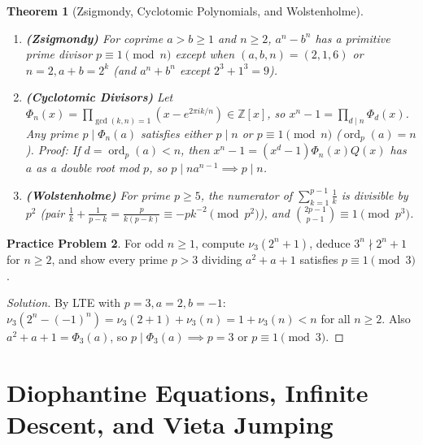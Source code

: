 \documentclass[11pt]{article}
\theoremstyle{plain}
\newtheorem{theorem}{Theorem}[section]
\theoremstyle{definition}
\newtheorem{problem}[theorem]{Practice Problem}
\newenvironment{solution}{\begin{proof}[Solution]}{\end{proof}}
\newcommand{\ZZ}{\mathbb{Z}}
\newcommand{\ord}{\operatorname{ord}}
\begin{document}
\begin{theorem}[Zsigmondy, Cyclotomic Polynomials, and Wolstenholme]
\leavevmode
\begin{enumerate}[label=(\alph*)]
\item \textbf{(Zsigmondy)} For coprime $a > b \ge 1$ and $n \ge 2$, $a^n - b^n$ has a primitive prime divisor $p \equiv 1 \pmod n$ except when $(a,b,n)=(2,1,6)$ or $n=2, a+b=2^k$ (and $a^n+b^n$ except $2^3+1^3=9$).
\item \textbf{(Cyclotomic Divisors)} Let $\Phi_n(x) = \prod_{\gcd(k,n)=1}(x - e^{2\pi i k/n}) \in \ZZ[x]$, so $x^n - 1 = \prod_{d\mid n}\Phi_d(x)$. Any prime $p \mid \Phi_n(a)$ satisfies either $p \mid n$ or $p \equiv 1 \pmod n$ ($\ord_p(a) = n$). \emph{Proof:} If $d = \ord_p(a) < n$, then $x^n - 1 = (x^d - 1)\Phi_n(x)Q(x)$ has $a$ as a double root mod $p$, so $p \mid n a^{n-1} \implies p \mid n$.
\item \textbf{(Wolstenholme)} For prime $p \ge 5$, the numerator of $\sum_{k=1}^{p-1}\frac{1}{k}$ is divisible by $p^2$ (pair $\frac{1}{k}+\frac{1}{p-k} = \frac{p}{k(p-k)} \equiv -p k^{-2} \pmod{p^2}$), and $\binom{2p-1}{p-1} \equiv 1 \pmod{p^3}$.
\end{enumerate}
\end{theorem}

\begin{problem}
For odd $n \ge 1$, compute $\nu_3(2^n + 1)$, deduce $3^n \nmid 2^n + 1$ for $n \ge 2$, and show every prime $p > 3$ dividing $a^2+a+1$ satisfies $p \equiv 1 \pmod 3$.
\end{problem}
\begin{solution}
By LTE with $p=3, a=2, b=-1$: $\nu_3(2^n - (-1)^n) = \nu_3(2+1) + \nu_3(n) = 1 + \nu_3(n) < n$ for all $n \ge 2$. Also $a^2+a+1 = \Phi_3(a)$, so $p \mid \Phi_3(a) \implies p = 3$ or $p \equiv 1 \pmod 3$.
\end{solution}

\section{Diophantine Equations, Infinite Descent, and Vieta Jumping}
\end{document}
